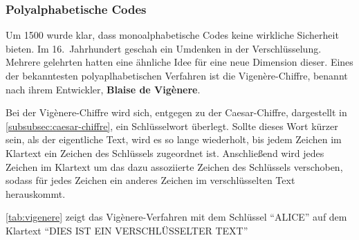 \subsubsection{Polyalphabetische Codes}\label{subsubsec:polyalphabetische-codes}
Um 1500 wurde klar, dass \gls{monoalphabetisch}e Codes keine wirkliche Sicherheit bieten.
Im 16.\ Jahrhundert geschah ein Umdenken in der Verschlüsselung.
Mehrere gelehrten hatten eine ähnliche Idee für eine neue Dimension dieser.\autocite[]{beutelspacher_kurze_2017}
Eines der bekanntesten polyaplhabetischen Verfahren ist die Vigenère-Chiffre, benannt nach ihrem Entwickler, \textbf{Blaise de Vigènere}.

Bei der Vigènere-Chiffre wird sich, entgegen zu der Caesar-Chiffre, dargestellt in \autoref{subsubsec:caesar-chiffre}, ein Schlüsselwort überlegt.
Sollte dieses Wort kürzer sein, als der eigentliche Text, wird es so lange wiederholt, bis jedem Zeichen im Klartext ein Zeichen des Schlüssels zugeordnet ist.
Anschließend wird jedes Zeichen im Klartext um das dazu assoziierte Zeichen des Schlüssels verschoben, sodass für jedes Zeichen ein anderes Zeichen im verschlüsselten Text herauskommt.

\autoref{tab:vigenere}\autocite[]{kryptographische_algorithmen} zeigt das Vigènere-Verfahren mit dem Schlüssel \enquote{ALICE} auf dem Klartext \enquote{DIES IST EIN VERSCHLÜSSELTER TEXT}

\begin{table}[htbp]
    \caption[
        Verschlüsselung mit Vigènere-Verfahren]{Verschlüsselung mit Vigènere-Verfahren\footnotemark}
    \label{tab:vigenere}
\end{table}

